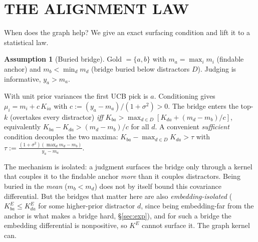 \documentclass[twoside]{article}
\theoremstyle{plain}
\theoremstyle{definition}
\newtheorem{assumption}{Assumption}\newtheorem{remark}{Remark}
\begin{document}
\section{THE ALIGNMENT LAW}\label{sec:law}
When does the graph help? We give an exact surfacing condition and lift it to a statistical law.
\begin{assumption}[Buried bridge]\label{ass:bridge}
Gold $=\{a,b\}$ with $m_a=\max_i m_i$ (findable anchor) and $m_b<\min_{d}m_d$ (bridge buried below distractors
$D$). Judging is informative, $y_a>m_a$.
\end{assumption}
\begin{lemma}[Surfacing]\label{lem:surface}
With unit prior variances the first UCB pick is $a$. Conditioning gives $\mu_i=m_i+c\,K_{ia}$ with
$c:=(y_a-m_a)/(1+\sigma^2)>0$. The bridge enters the top-$k$ (overtakes every distractor) \emph{iff}
$K_{ba}>\max_{d\in D}[K_{da}+(m_d-m_b)/c]$, equivalently $K_{ba}-K_{da}>(m_d-m_b)/c$ for all $d$. A convenient
\emph{sufficient} condition decouples the two maxima: $K_{ba}-\max_{d\in D}K_{da}>\tau$ with
$\tau:=\frac{(1+\sigma^2)(\max_d m_d-m_b)}{y_a-m_a}$.
\end{lemma}
The mechanism is isolated: a judgment surfaces the bridge only through a kernel that couples it to the findable
anchor \emph{more} than it couples distractors. Being buried in the \emph{mean} ($m_b<m_d$) does not by itself
bound this covariance differential. But the bridges that matter here are also \emph{embedding-isolated}
($K^E_{ba}\le K^E_{da}$ for some higher-prior distractor $d$, since being embedding-far from the anchor is what
makes a bridge hard, \S\ref{sec:exp}), and for such a bridge the embedding differential is nonpositive, so $K^E$ cannot
surface it. The graph kernel can.
\end{document}
